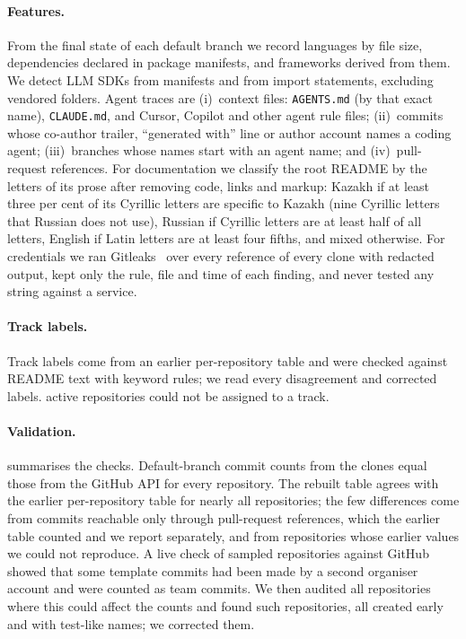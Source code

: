 \documentclass{article}
\begin{document}
\paragraph{Features.}
From the final state of each default branch we record languages by file size, dependencies declared in package manifests, and frameworks derived from them. We detect LLM SDKs from manifests and from import statements, excluding vendored folders. Agent traces are (i)~context files: \texttt{AGENTS.md} (by that exact name), \texttt{CLAUDE.md}, and Cursor, Copilot and other agent rule files; (ii)~commits whose co-author trailer, ``generated with'' line or author account names a coding agent; (iii)~branches whose names start with an agent name; and (iv)~pull-request references. For documentation we classify the root README by the letters of its prose after removing code, links and markup: Kazakh if at least three per cent of its Cyrillic letters are specific to Kazakh (nine Cyrillic letters that Russian does not use), Russian if Cyrillic letters are at least half of all letters, English if Latin letters are at least four fifths, and mixed otherwise. For credentials we ran Gitleaks~\cite{gitleaks2026} over every reference of every clone with redacted output, kept only the rule, file and time of each finding, and never tested any string against a service.

\paragraph{Track labels.}
Track labels come from an earlier per-repository table and were checked against README text with keyword rules; we read every disagreement and corrected \NLabelFixes{} labels. \NReposTrackUnclear{} active repositories could not be assigned to a track.

\paragraph{Validation.}
 summarises the checks. Default-branch commit counts from the clones equal those from the GitHub API for every repository. The rebuilt table agrees with the earlier per-repository table for nearly all repositories; the few differences come from commits reachable only through pull-request references, which the earlier table counted and we report separately, and from repositories whose earlier values we could not reproduce. A live check of \NChecksLiveSpotCheckN{} sampled repositories against GitHub showed that some template commits had been made by a second organiser account and were counted as team commits. We then audited all \NTemplateAuditN{} repositories where this could affect the counts and found \NValidationTemplateFixes{} such repositories, all created early and with test-like names; we corrected them.
\end{document}
